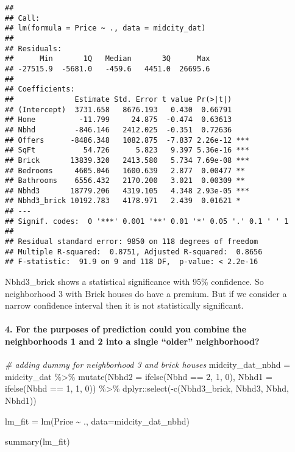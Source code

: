 \documentclass[
]{article}
\newenvironment{Shaded}{\begin{snugshade}}{\end{snugshade}}
\newcommand{\AttributeTok}[1]{\textcolor[rgb]{0.77,0.63,0.00}{#1}}
\newcommand{\CommentTok}[1]{\textcolor[rgb]{0.56,0.35,0.01}{\textit{#1}}}
\newcommand{\DecValTok}[1]{\textcolor[rgb]{0.00,0.00,0.81}{#1}}
\newcommand{\FunctionTok}[1]{\textcolor[rgb]{0.00,0.00,0.00}{#1}}
\newcommand{\NormalTok}[1]{#1}
\newcommand{\OtherTok}[1]{\textcolor[rgb]{0.56,0.35,0.01}{#1}}
\newcommand{\SpecialCharTok}[1]{\textcolor[rgb]{0.00,0.00,0.00}{#1}}
\begin{document}
\begin{verbatim}
## 
## Call:
## lm(formula = Price ~ ., data = midcity_dat)
## 
## Residuals:
##      Min       1Q   Median       3Q      Max 
## -27515.9  -5681.0   -459.6   4451.0  26695.6 
## 
## Coefficients:
##              Estimate Std. Error t value Pr(>|t|)    
## (Intercept)  3731.658   8676.193   0.430  0.66791    
## Home          -11.799     24.875  -0.474  0.63613    
## Nbhd         -846.146   2412.025  -0.351  0.72636    
## Offers      -8486.348   1082.875  -7.837 2.26e-12 ***
## SqFt           54.726      5.823   9.397 5.36e-16 ***
## Brick       13839.320   2413.580   5.734 7.69e-08 ***
## Bedrooms     4605.046   1600.639   2.877  0.00477 ** 
## Bathrooms    6556.432   2170.200   3.021  0.00309 ** 
## Nbhd3       18779.206   4319.105   4.348 2.93e-05 ***
## Nbhd3_brick 10192.783   4178.971   2.439  0.01621 *  
## ---
## Signif. codes:  0 '***' 0.001 '**' 0.01 '*' 0.05 '.' 0.1 ' ' 1
## 
## Residual standard error: 9850 on 118 degrees of freedom
## Multiple R-squared:  0.8751, Adjusted R-squared:  0.8656 
## F-statistic:  91.9 on 9 and 118 DF,  p-value: < 2.2e-16
\end{verbatim}

Nbhd3\_brick shows a statistical significance with 95\% confidence. So
neighborhood 3 with Brick houses do have a premium. But if we consider a
narrow confidence interval then it is not statistically significant.

\hypertarget{for-the-purposes-of-prediction-could-you-combine-the-neighborhoods-1-and-2-into-a-single-older-neighborhood}{%
\paragraph{4. For the purposes of prediction could you combine the
neighborhoods 1 and 2 into a single ``older''
neighborhood?}\label{for-the-purposes-of-prediction-could-you-combine-the-neighborhoods-1-and-2-into-a-single-older-neighborhood}}

\begin{Shaded}
\begin{Highlighting}[]
\CommentTok{\# adding dummy for neighborhood 3 and brick houses}
\NormalTok{midcity\_dat\_nbhd }\OtherTok{=}\NormalTok{ midcity\_dat }\SpecialCharTok{\%\textgreater{}\%} \FunctionTok{mutate}\NormalTok{(}\AttributeTok{Nbhd2 =} \FunctionTok{ifelse}\NormalTok{(Nbhd }\SpecialCharTok{==} \DecValTok{2}\NormalTok{, }\DecValTok{1}\NormalTok{, }\DecValTok{0}\NormalTok{), }\AttributeTok{Nbhd1 =} \FunctionTok{ifelse}\NormalTok{(Nbhd }\SpecialCharTok{==} \DecValTok{1}\NormalTok{, }\DecValTok{1}\NormalTok{, }\DecValTok{0}\NormalTok{)) }\SpecialCharTok{\%\textgreater{}\%}\NormalTok{ dplyr}\SpecialCharTok{::}\FunctionTok{select}\NormalTok{(}\SpecialCharTok{{-}}\FunctionTok{c}\NormalTok{(Nbhd3\_brick, Nbhd3, Nbhd, Nbhd1))}


\NormalTok{lm\_fit }\OtherTok{=} \FunctionTok{lm}\NormalTok{(Price  }\SpecialCharTok{\textasciitilde{}}\NormalTok{ ., }\AttributeTok{data=}\NormalTok{midcity\_dat\_nbhd)}

\FunctionTok{summary}\NormalTok{(lm\_fit)}
\end{Highlighting}
\end{Shaded}
\end{document}

